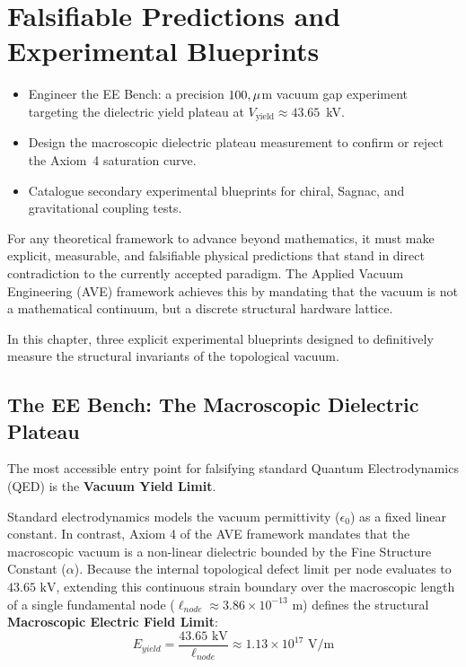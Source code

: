 \chapter{Falsifiable Predictions and Experimental Blueprints}
\label{ch:falsifiable_predictions}


\begin{objectivebox}
\begin{itemize}
    \item Engineer the EE Bench: a precision $100\\,\mu$m vacuum gap experiment targeting the dielectric yield plateau at $V_{\text{yield}} \approx 43.65$~kV.
    \item Design the macroscopic dielectric plateau measurement to confirm or reject the Axiom~4 saturation curve.
    \item Catalogue secondary experimental blueprints for chiral, Sagnac, and gravitational coupling tests.
\end{itemize}
\end{objectivebox}

For any theoretical framework to advance beyond mathematics, it must make explicit, measurable, and falsifiable physical predictions that stand in direct contradiction to the currently accepted paradigm. The Applied Vacuum Engineering (AVE) framework achieves this by mandating that the vacuum is not a mathematical continuum, but a discrete structural hardware lattice.

In this chapter, three explicit experimental blueprints designed to definitively measure the structural invariants of the topological vacuum.

\section{The EE Bench: The Macroscopic Dielectric Plateau}
The most accessible entry point for falsifying standard Quantum Electrodynamics (QED) is the \textbf{Vacuum Yield Limit}.

Standard electrodynamics models the vacuum permittivity ($\epsilon_0$) as a fixed linear constant. In contrast, Axiom 4 of the AVE framework mandates that the macroscopic vacuum is a non-linear dielectric bounded by the Fine Structure Constant ($\alpha$). Because the internal topological defect limit per node evaluates to $43.65 \text{ kV}$, extending this continuous strain boundary over the macroscopic length of a single fundamental node ($\ell_{node} \approx 3.86 \times 10^{-13} \text{ m}$) defines the structural \textbf{Macroscopic Electric Field Limit}:
\begin{equation}
    E_{yield} = \frac{43.65 \text{ kV}}{\ell_{node}} \approx 1.13 \times 10^{17} \text{ V/m}
\end{equation}

